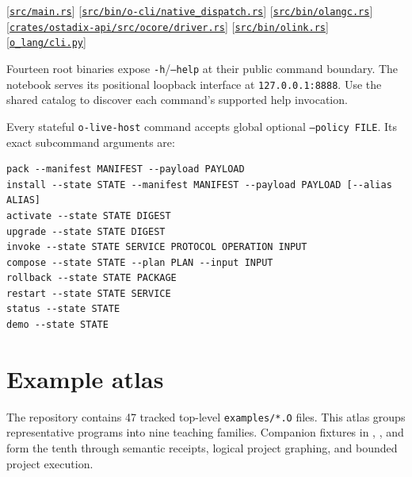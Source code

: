 \documentclass[11pt,oneside]{article}
\newcommand{\src}[1]{\textcolor{OSlate}{\scriptsize[\href{https://github.com/lostadi/OSTADIX/blob/c0b02c326b2329a95ba52447c7180bc93957cd57/#1}{\nolinkurl{#1}}]}\allowbreak}
\begin{document}
\src{src/main.rs}
\src{src/bin/o-cli/native_dispatch.rs}
\src{src/bin/olangc.rs}
\src{crates/ostadix-api/src/ocore/driver.rs}
\src{src/bin/olink.rs}
\src{o_lang/cli.py}

Fourteen root binaries expose \texttt{-h}/\texttt{--help} at their public
command boundary. The notebook serves its positional loopback interface at
\texttt{127.0.0.1:8888}. Use the shared catalog to discover each command's supported help invocation.

Every stateful \texttt{o-live-host} command accepts global optional
\texttt{--policy FILE}. Its exact subcommand arguments are:

\begin{lstlisting}[style=plaincode]
pack --manifest MANIFEST --payload PAYLOAD
install --state STATE --manifest MANIFEST --payload PAYLOAD [--alias ALIAS]
activate --state STATE DIGEST
upgrade --state STATE DIGEST
invoke --state STATE SERVICE PROTOCOL OPERATION INPUT
compose --state STATE --plan PLAN --input INPUT
rollback --state STATE PACKAGE
restart --state STATE SERVICE
status --state STATE
demo --state STATE
\end{lstlisting}

\section{Example atlas}

The repository contains 47 tracked top-level \texttt{examples/*.O} files.
This atlas groups representative programs into nine teaching families. Companion
fixtures in ,
, and
 form the tenth through semantic
receipts, logical project graphing, and bounded project execution.
\end{document}
